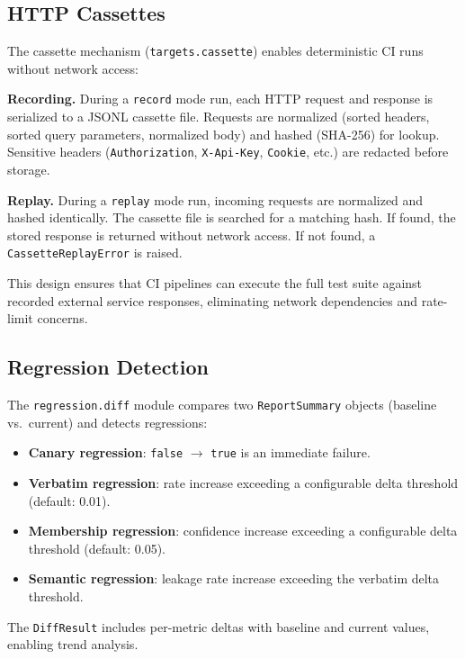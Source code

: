 \documentclass[11pt,a4paper]{article}
\begin{document}
\subsection{HTTP Cassettes}

The cassette mechanism (\texttt{targets.cassette}) enables deterministic
CI runs without network access:

\textbf{Recording.} During a \texttt{record} mode run, each HTTP request
and response is serialized to a JSONL cassette file. Requests are
normalized (sorted headers, sorted query parameters, normalized body) and
hashed (SHA-256) for lookup. Sensitive headers
(\texttt{Authorization}, \texttt{X-Api-Key}, \texttt{Cookie}, etc.)
are redacted before storage.

\textbf{Replay.} During a \texttt{replay} mode run, incoming requests are
normalized and hashed identically. The cassette file is searched for a
matching hash. If found, the stored response is returned without network
access. If not found, a \texttt{CassetteReplayError} is raised.

This design ensures that CI pipelines can execute the full test suite
against recorded external service responses, eliminating network
dependencies and rate-limit concerns.

\subsection{Regression Detection}

The \texttt{regression.diff} module compares two \texttt{ReportSummary}
objects (baseline vs.\ current) and detects regressions:

\begin{itemize}[nosep]
  \item \textbf{Canary regression}: \texttt{false} $\to$ \texttt{true} is
        an immediate failure.
  \item \textbf{Verbatim regression}: rate increase exceeding a
        configurable delta threshold (default: 0.01).
  \item \textbf{Membership regression}: confidence increase exceeding a
        configurable delta threshold (default: 0.05).
  \item \textbf{Semantic regression}: leakage rate increase exceeding the
        verbatim delta threshold.
\end{itemize}

The \texttt{DiffResult} includes per-metric deltas with baseline and
current values, enabling trend analysis.
\end{document}
